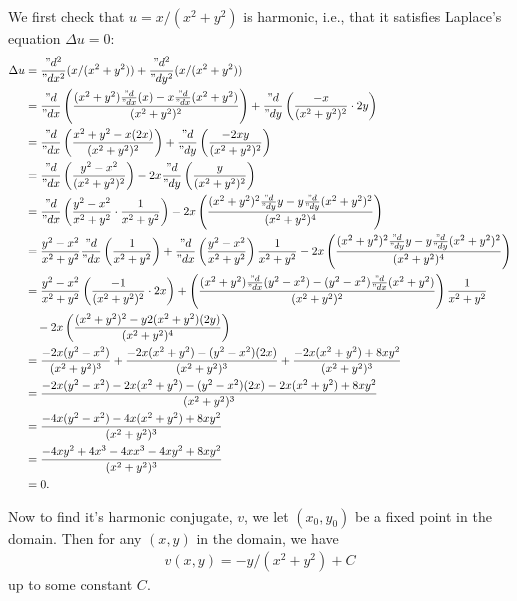 \documentclass[12pt]{article}
\newcommand{\pd}[2]{\frac{"d#1}{"d#2}}
\newcommand{\pdn}[3]{\frac{"d^{#3}#1}{"d#2^{#3}}}
\begin{document}
\paragraph{}

We first check that $u=x/(x^2+y^2)$ is harmonic, i.e., that it satisfies Laplace's equation $\Delta u=0$:
\begin{align*}
    \Delta u 
        &= \pdn{}{x}{2}(x/(x^2+y^2)) + \pdn{}{y}{2}(x/(x^2+y^2)) \\
        &= \pd{}{x}\left(\frac{(x^2+y^2)\pd{}{x}(x) - x\pd{}{x}(x^2+y^2)}{(x^2+y^2)^2}\right) + \pd{}{y}\left(\frac{-x}{(x^2+y^2)^2}\cdot 2y\right) \\
        &= \pd{}{x}\left(\frac{x^2+y^2 - x(2x)}{(x^2+y^2)^2}\right) + \pd{}{y}\left(\frac{-2xy}{(x^2+y^2)^2}\right) \\
        &= \pd{}{x}\left(\frac{y^2-x^2}{(x^2+y^2)^2}\right) -2x\pd{}{y}\left(\frac{y}{(x^2+y^2)^2}\right) \\
        &= \pd{}{x}\left(\frac{y^2-x^2}{x^2+y^2}\cdot\frac1{x^2+y^2}\right) -2x\left(\frac{(x^2+y^2)^2\pd{}{y}y - y\pd{}{y}(x^2+y^2)^2}{(x^2+y^2)^4}\right) \\
        &= \frac{y^2-x^2}{x^2+y^2}\pd{}{x}\left(\frac1{x^2+y^2}\right) + \pd{}{x}\left(\frac{y^2-x^2}{x^2+y^2}\right)\frac1{x^2+y^2} -2x\left(\frac{(x^2+y^2)^2\pd{}{y}y - y\pd{}{y}(x^2+y^2)^2}{(x^2+y^2)^4}\right) \\
        &= \frac{y^2-x^2}{x^2+y^2}\left(\frac{-1}{(x^2+y^2)^2}\cdot 2x\right) + \left(\frac{(x^2+y^2)\pd{}{x}(y^2-x^2) - (y^2-x^2)\pd{}{x}(x^2+y^2) }{(x^2+y^2)^2}\right)\frac1{x^2+y^2} \\
        &\quad -2x\left(\frac{(x^2+y^2)^2 - y2(x^2+y^2)(2y)}{(x^2+y^2)^4}\right) \\
        &= \frac{-2x(y^2-x^2)}{(x^2+y^2)^3} + \frac{-2x(x^2+y^2) - (y^2-x^2)(2x)}{(x^2+y^2)^3} +\frac{-2x(x^2+y^2) + 8xy^2}{(x^2+y^2)^3}\\
        &= \frac{-2x(y^2-x^2) -2x(x^2+y^2) - (y^2-x^2)(2x) - 2x(x^2+y^2) + 8xy^2}{(x^2+y^2)^3} \\
        &= \frac{-4x(y^2-x^2) -4x(x^2+y^2) + 8xy^2}{(x^2+y^2)^3} \\
        &= \frac{-4xy^2 + 4x^3 -4xx^3 - 4xy^2 + 8xy^2}{(x^2+y^2)^3} \\
        &= 0.
\end{align*}

Now to find it's harmonic conjugate, $v$, we let $(x_0,y_0)$ be a fixed point in the domain. Then for any $(x,y)$ in the domain, we have
\begin{align*}
    v(x,y) = -y/(x^2+y^2) + C
\end{align*}
up to some constant $C$.
\end{document}
